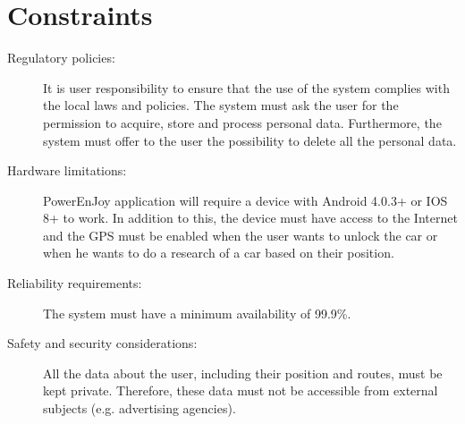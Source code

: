 \section{Constraints}
\begin{description}
\item[Regulatory policies:] It is user responsibility to ensure that the use of the system complies with the
local laws and policies.
The system must ask the user for the permission to acquire, store and process personal data. Furthermore, the system must offer to the user the possibility to delete all the personal data.
\item[Hardware limitations:] PowerEnJoy application will require a device with Android 4.0.3+ or IOS 8+ to work. In addition to this, the device must have access to the Internet and the GPS must be enabled when the user wants to unlock the car or when he wants to do a research of a car based on their position.
\item[Reliability requirements:] The system must have a minimum availability of 99.9\%.
\item[Safety and security considerations:] All the data about the user, including their position and routes, must be kept private.
Therefore, these data must not be accessible from external subjects (e.g. advertising agencies).
\end{description}
